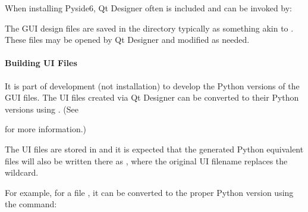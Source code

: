 \documentclass[letterpaper,11pt,english]{sphinxmanual}
\begin{document}
\sphinxAtStartPar
When installing Pyside6, Qt Designer often is included and can be invoked by:

\begin{sphinxVerbatim}[commandchars=\\\{\}]
\end{sphinxVerbatim}

\sphinxAtStartPar
The GUI design files are saved in the
 directory typically as
something akin to . These files may be opened by Qt Designer
and modified as needed.


\paragraph{Building UI Files}
\label{\detokenize{technical/architecture/graphical_user_interface:building-ui-files}}\label{\detokenize{technical/architecture/graphical_user_interface:technical-architecture-graphical-user-interface-building-ui-files}}
\sphinxAtStartPar
It is part of development (not installation) to develop the Python versions of
the GUI files. The UI files created via Qt Designer can be converted to their
Python versions using . (See
%
\begin{footnote}[60]\sphinxAtStartFootnote
{}
%
\end{footnote}
for more information.)

\sphinxAtStartPar
The UI files are stored in 
and it is expected that the generated Python equivalent files will also be
written there as , where the original UI filename replaces
the wildcard.

\sphinxAtStartPar
For example, for a file , it can be converted to the proper
Python version using the command:

\begin{sphinxVerbatim}[commandchars=\\\{\}]
   
\end{sphinxVerbatim}
\end{document}

